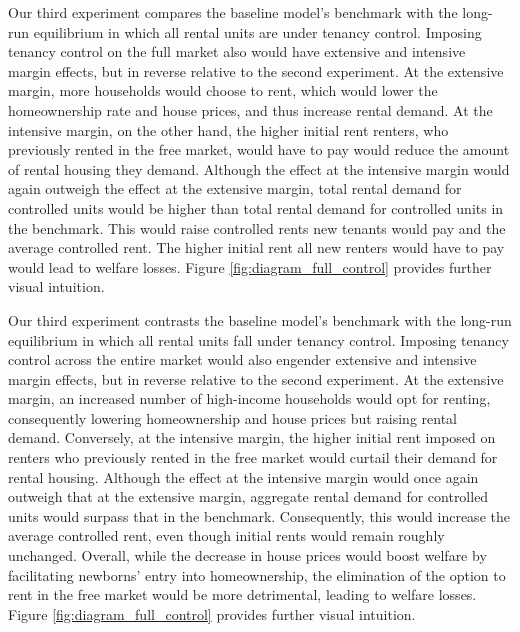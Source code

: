 \documentclass[parskip=full]{article}
\begin{document}
Our third experiment compares the baseline model's benchmark with the long-run equilibrium in which all rental units are under tenancy control. Imposing tenancy control on the full market also would have extensive and intensive margin effects, but in reverse relative to the second experiment. At the extensive margin, more households would choose to rent, which would lower the homeownership rate and house prices, and thus increase rental demand. At the intensive margin, on the other hand, the higher initial rent renters, who previously rented in the free market, would have to pay would reduce the amount of rental housing they demand. Although the effect at the intensive margin would again outweigh the effect at the extensive margin, total rental demand for controlled units would be higher than total rental demand for controlled units in the benchmark. This would raise controlled rents new tenants would pay and the average controlled rent. The higher initial rent all new renters would have to pay would lead to welfare losses. Figure \ref{fig:diagram_full_control} provides further visual intuition.

Our third experiment contrasts the baseline model's benchmark with the long-run equilibrium in which all rental units fall under tenancy control. Imposing tenancy control across the entire market would also engender extensive and intensive margin effects, but in reverse relative to the second experiment. At the extensive margin, an increased number of high-income households would opt for renting, consequently lowering homeownership and house prices but raising rental demand. Conversely, at the intensive margin, the higher initial rent imposed on renters who previously rented in the free market would curtail their demand for rental housing. Although the effect at the intensive margin would once again outweigh that at the extensive margin, aggregate rental demand for controlled units would surpass that in the benchmark. Consequently, this would increase the average controlled rent, even though initial rents would remain roughly unchanged. Overall, while the decrease in house prices would boost welfare by facilitating newborns' entry into homeownership, the elimination of the option to rent in the free market would be more detrimental, leading to welfare losses. Figure \ref{fig:diagram_full_control} provides further visual intuition.
\end{document}
